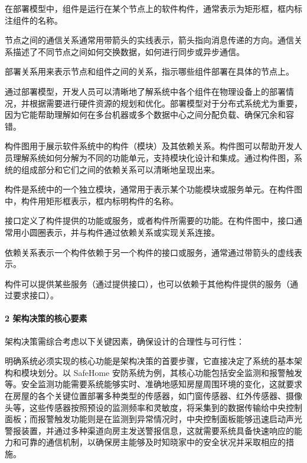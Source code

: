 在部署模型中，组件是运行在某个节点上的软件构件，通常表示为矩形框，框内标注组件的名称。

节点之间的通信关系通常用带箭头的实线表示，箭头指向消息传递的方向。通信关系描述了不同节点之间如何交换数据，如何进行同步或异步通信。

部署关系用来表示节点和组件之间的关系，指示哪些组件部署在具体的节点上。

通过部署模型，开发人员可以清晰地了解系统中各个组件在物理设备上的部署情况，并根据需要进行硬件资源的规划和优化。部署模型对于分布式系统尤为重要，因为它能帮助理解如何在多台机器或多个数据中心之间分配负载、确保冗余和容错。


构件图用于展示软件系统中的构件（模块）及其依赖关系。构件图可以帮助开发人员理解系统如何分解为不同的功能单元，支持模块化设计和集成。通过构件图，系统的组成部分和它们之间的依赖关系可以清晰地呈现出来。

构件是系统中的一个独立模块，通常用于表示某个功能模块或服务单元。在构件图中，构件用矩形框表示，框内标明构件的名称。

接口定义了构件提供的功能或服务，或者构件所需要的功能。在构件图中，接口通常用小圆圈表示，并与构件通过依赖关系或实现关系连接。

依赖关系表示一个构件依赖于另一个构件的接口或服务，通常通过带箭头的虚线表示。

构件可以提供某些服务（通过提供接口），也可以依赖于其他构件提供的服务（通过要求接口）。

\hypertarget{ux67b6ux6784ux51b3ux7b56ux7684ux6838ux5fc3ux8981ux7d20}{%
\paragraph{2 架构决策的核心要素}\label{ux67b6ux6784ux51b3ux7b56ux7684ux6838ux5fc3ux8981ux7d20}}

架构决策需综合考虑以下关键因素，确保设计的合理性与可行性：


明确系统必须实现的核心功能是架构决策的首要步骤，它直接决定了系统的基本架构和模块划分。以 SafeHome 安防系统为例，其核心功能包括安全监测和报警触发等。安全监测功能需要系统能够实时、准确地感知房屋周围环境的变化，这就要求在房屋的各个关键位置部署多种类型的传感器，如门窗传感器、红外传感器、摄像头等，这些传感器按照预设的监测频率和灵敏度，将采集到的数据传输给中央控制面板；而报警触发功能则是在监测到异常情况时，中央控制面板能够迅速启动声光警报装置，并通过多种渠道向房主发送警报信息，这就需要系统具备快速响应的能力和可靠的通信机制，以确保房主能够及时知晓家中的安全状况并采取相应的措施。

